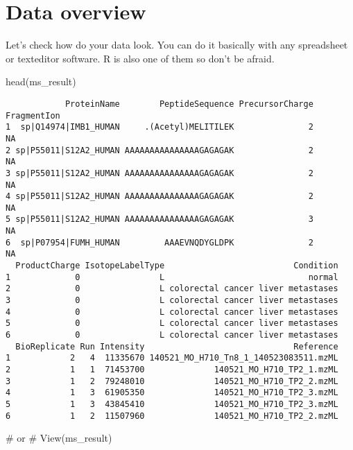 \documentclass[
  letterpaper,
  DIV=11,
  numbers=noendperiod]{scrartcl}
\newenvironment{Shaded}{\begin{snugshade}}{\end{snugshade}}
\newcommand{\CommentTok}[1]{\textcolor[rgb]{0.37,0.37,0.37}{#1}}
\newcommand{\FunctionTok}[1]{\textcolor[rgb]{0.28,0.35,0.67}{#1}}
\newcommand{\NormalTok}[1]{\textcolor[rgb]{0.00,0.23,0.31}{#1}}
\begin{document}
\section{Data overview}\label{data-overview}

Let's check how do your data look. You can do it basically with any
spreadsheet or texteditor software. R is also one of them so don't be
afraid.

\begin{Shaded}
\begin{Highlighting}[]
\FunctionTok{head}\NormalTok{(ms\_result)}
\end{Highlighting}
\end{Shaded}

\begin{verbatim}
            ProteinName        PeptideSequence PrecursorCharge FragmentIon
1  sp|Q14974|IMB1_HUMAN     .(Acetyl)MELITILEK               2          NA
2 sp|P55011|S12A2_HUMAN AAAAAAAAAAAAAAAGAGAGAK               2          NA
3 sp|P55011|S12A2_HUMAN AAAAAAAAAAAAAAAGAGAGAK               2          NA
4 sp|P55011|S12A2_HUMAN AAAAAAAAAAAAAAAGAGAGAK               2          NA
5 sp|P55011|S12A2_HUMAN AAAAAAAAAAAAAAAGAGAGAK               3          NA
6  sp|P07954|FUMH_HUMAN         AAAEVNQDYGLDPK               2          NA
  ProductCharge IsotopeLabelType                          Condition
1             0                L                             normal
2             0                L colorectal cancer liver metastases
3             0                L colorectal cancer liver metastases
4             0                L colorectal cancer liver metastases
5             0                L colorectal cancer liver metastases
6             0                L colorectal cancer liver metastases
  BioReplicate Run Intensity                              Reference
1            2   4  11335670 140521_MO_H710_Tn8_1_140523083511.mzML
2            1   1  71453700              140521_MO_H710_TP2_1.mzML
3            1   2  79248010              140521_MO_H710_TP2_2.mzML
4            1   3  61905350              140521_MO_H710_TP2_3.mzML
5            1   3  43845410              140521_MO_H710_TP2_3.mzML
6            1   2  11507960              140521_MO_H710_TP2_2.mzML
\end{verbatim}

\begin{Shaded}
\begin{Highlighting}[]
\CommentTok{\# or }
\CommentTok{\# View(ms\_result)}
\end{Highlighting}
\end{Shaded}
\end{document}
